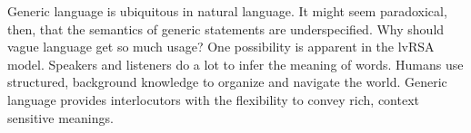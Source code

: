 \documentclass[10pt,letterpaper]{article}
\begin{document}
Generic language is ubiquitous in natural language. It might seem paradoxical, then, that the semantics of generic statements are underspecified. Why should vague language get so much usage? One possibility is apparent in the lvRSA model. Speakers and listeners do a lot to infer the meaning of words. Humans use structured, background knowledge to organize and navigate the world. Generic language provides interlocutors with the flexibility to convey rich, context sensitive meanings. 




%
%
%
%
%
%
%
\end{document}
